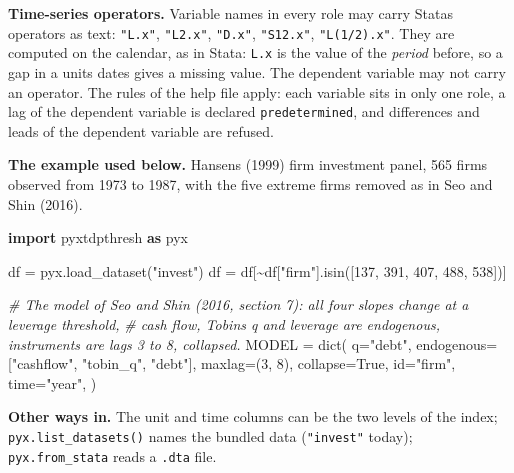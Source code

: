 \documentclass[
  10.5pt,
  a4paper,
]{article}
\newenvironment{Shaded}{}{}
\newcommand{\BuiltInTok}[1]{\textcolor[rgb]{0.00,0.50,0.00}{#1}}
\newcommand{\CommentTok}[1]{\textcolor[rgb]{0.38,0.63,0.69}{\textit{#1}}}
\newcommand{\DecValTok}[1]{\textcolor[rgb]{0.25,0.63,0.44}{#1}}
\newcommand{\ImportTok}[1]{\textcolor[rgb]{0.00,0.50,0.00}{\textbf{#1}}}
\newcommand{\NormalTok}[1]{#1}
\newcommand{\OperatorTok}[1]{\textcolor[rgb]{0.40,0.40,0.40}{#1}}
\newcommand{\StringTok}[1]{\textcolor[rgb]{0.25,0.44,0.63}{#1}}
\newcommand{\VariableTok}[1]{\textcolor[rgb]{0.10,0.09,0.49}{#1}}
\begin{document}
\textbf{Time-series operators.} Variable names in every role may carry
Stata\textquotesingle s operators as text: \texttt{"L.x"},
\texttt{"L2.x"}, \texttt{"D.x"}, \texttt{"S12.x"}, \texttt{"L(1/2).x"}.
They are computed on the calendar, as in Stata: \texttt{L.x} is the
value of the \emph{period} before, so a gap in a unit\textquotesingle s
dates gives a missing value. The dependent variable may not carry an
operator. The rules of the help file apply: each variable sits in only
one role, a lag of the dependent variable is declared
\texttt{predetermined}, and differences and leads of the dependent
variable are refused.

\textbf{The example used below.} Hansen\textquotesingle s (1999) firm
investment panel, 565 firms observed from 1973 to 1987, with the five
extreme firms removed as in Seo and Shin (2016).

\begin{Shaded}
\begin{Highlighting}[]
\ImportTok{import}\NormalTok{ pyxtdpthresh }\ImportTok{as}\NormalTok{ pyx}

\NormalTok{df }\OperatorTok{=}\NormalTok{ pyx.load\_dataset(}\StringTok{"invest"}\NormalTok{)}
\NormalTok{df }\OperatorTok{=}\NormalTok{ df[}\OperatorTok{\textasciitilde{}}\NormalTok{df[}\StringTok{"firm"}\NormalTok{].isin([}\DecValTok{137}\NormalTok{, }\DecValTok{391}\NormalTok{, }\DecValTok{407}\NormalTok{, }\DecValTok{488}\NormalTok{, }\DecValTok{538}\NormalTok{])]}

\CommentTok{\# The model of Seo and Shin (2016, section 7): all four slopes change at a leverage threshold,}
\CommentTok{\# cash flow, Tobin\textquotesingle{}s q and leverage are endogenous, instruments are lags 3 to 8, collapsed.}
\NormalTok{MODEL }\OperatorTok{=} \BuiltInTok{dict}\NormalTok{(}
\NormalTok{    q}\OperatorTok{=}\StringTok{"debt"}\NormalTok{,}
\NormalTok{    endogenous}\OperatorTok{=}\NormalTok{[}\StringTok{"cashflow"}\NormalTok{, }\StringTok{"tobin\_q"}\NormalTok{, }\StringTok{"debt"}\NormalTok{],}
\NormalTok{    maxlag}\OperatorTok{=}\NormalTok{(}\DecValTok{3}\NormalTok{, }\DecValTok{8}\NormalTok{),}
\NormalTok{    collapse}\OperatorTok{=}\VariableTok{True}\NormalTok{,}
    \BuiltInTok{id}\OperatorTok{=}\StringTok{"firm"}\NormalTok{,}
\NormalTok{    time}\OperatorTok{=}\StringTok{"year"}\NormalTok{,}
\NormalTok{)}
\end{Highlighting}
\end{Shaded}

\textbf{Other ways in.} The unit and time columns can be the two levels
of the index; \texttt{pyx.list\_datasets()} names the bundled data
(\texttt{"invest"} today); \texttt{pyx.from\_stata} reads a
\texttt{.dta} file.
\end{document}

